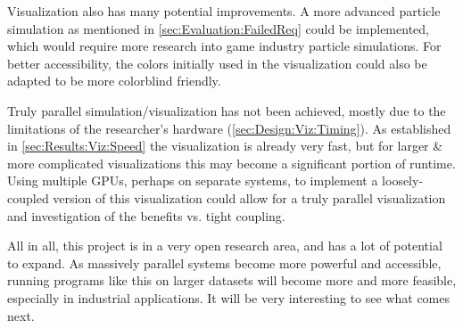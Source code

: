 Visualization also has many potential improvements.
A more advanced particle simulation as mentioned in \cref{sec:Evaluation:FailedReq} could be implemented, which would require more research into game industry particle simulations.
For better accessibility, the colors initially used in the visualization could also be adapted to be more colorblind friendly.

Truly parallel simulation/visualization has not been achieved, mostly due to the limitations of the researcher's hardware (\cref{sec:Design:Viz:Timing}).
As established in \cref{sec:Results:Viz:Speed} the visualization is already very fast, but for larger \& more complicated visualizations this may become a significant portion of runtime.
Using multiple GPUs, perhaps on separate systems, to implement a loosely-coupled version of this visualization could allow for a truly parallel visualization and investigation of the benefits vs. tight coupling.

All in all, this project is in a very open research area, and has a lot of potential to expand.
As massively parallel systems become more powerful and accessible, running programs like this on larger datasets will become more and more feasible, especially in industrial applications.
It will be very interesting to see what comes next.
